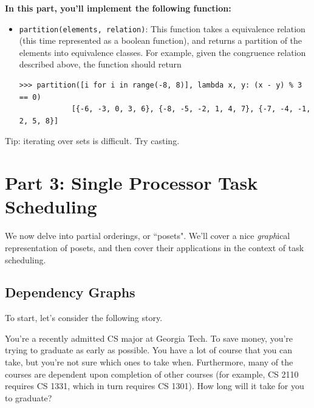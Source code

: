 \documentclass{article}
\begin{document}
    \vspace{3mm}
    \begin{tcolorbox}[colback=yellow!30]
        \textbf{In this part, you'll implement the following function:}
        \begin{itemize}
            \item \lstinline{partition(elements, relation)}: This function takes a equivalence relation (this time represented as a boolean function), and returns a partition of the elements into equivalence classes. For example, given the congruence relation described above, the function should return
        \begin{lstlisting}[belowskip=-10pt]
            >>> partition([i for i in range(-8, 8)], lambda x, y: (x - y) % 3 == 0)
            [{-6, -3, 0, 3, 6}, {-8, -5, -2, 1, 4, 7}, {-7, -4, -1, 2, 5, 8}]
        \end{lstlisting}

        \end{itemize}

        Tip: iterating over sets is difficult. Try casting.
    \end{tcolorbox}


\section*{Part 3: Single Processor Task Scheduling}

    We now delve into partial orderings, or ``posets". We'll cover a nice \textit{graph}ical representation of posets, and then cover their applications in the context of task scheduling. 
    

    \subsection*{Dependency Graphs}
    
    To start, let's consider the following story. 

    \begin{tcolorbox}[colback=red!20]
        You're a recently admitted CS major at Georgia Tech. To save money, you're trying to graduate as early as possible.  You have a lot of course that you can take, but you're not sure which ones to take when. Furthermore, many of the courses are dependent upon completion of other courses (for example, CS 2110 requires CS 1331, which in turn requires CS 1301). How long will it take for you to graduate?
    \end{tcolorbox}
\end{document}
